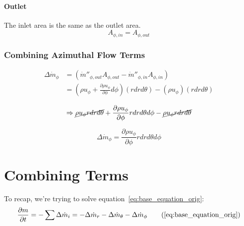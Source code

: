 \documentclass[12pt, letterpaper, twoside]{article}
\begin{document}
        \paragraph{Outlet}
            The inlet area is the same as the outlet area.
            \begin{equation}
                A_{\phi,in} = A_{\phi,out}
            \end{equation}

        \subsubsection{Combining Azimuthal Flow Terms}
            \begin{equation*}
            \begin{split}
                \Delta\dot{m}_{\phi} & = (\dot{m}''_{\phi,out} A_{\phi,out} - \dot{m}''_{\phi,in} A_{\phi,in}) \\
                & = \left( \rho u_{\phi}  + \frac{\partial \rho u_{\phi}}{\partial \phi} d\phi \right)
                \left(r dr d\theta \right) -
                \left(\rho u_{\phi} \right) \left(r dr d\theta \right)
            \end{split}
            \end{equation*}

            \begin{equation*}
                \Rightarrow
                \cancel{\rho u_\phi r dr d\theta} + \frac{\partial \rho u_{\phi}}{\partial \phi} r dr d\theta d\phi -
                \cancel{\rho u_\phi r dr d\theta} 
            \end{equation*}

            \begin{equation}\label{eq:mdotphi}
                \boxed{\Delta\dot{m}_{\phi} = \frac{\partial \rho u_{\phi}}{\partial \phi} r dr d\theta d\phi }
            \end{equation}


\section{Combining Terms}\label{sect:combineterms}
To recap, we're trying to solve equation~\ref{eq:base_equation_orig}:
    \begin{equation}
        \frac{\partial m}{\partial t} = - \sum \Delta\dot{m}_i = -\Delta\dot{m}_r - \Delta\dot{m}_{\theta} - \Delta\dot{m}_{\phi} 
        \tag{\ref{eq:base_equation_orig}}
    \end{equation}
\end{document}
